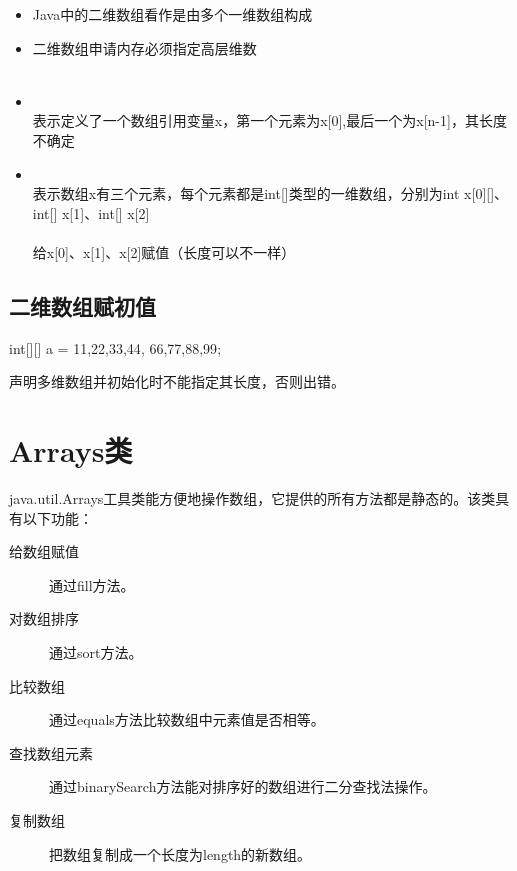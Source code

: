\begin{itemize}
\item Java中的二维数组看作是由多个一维数组构成
\item 二维数组申请内存必须指定{\Red 高层维数}\\
  \\
\item {}\\
  {\kai\Blue 表示定义了一个数组引用变量x，第一个元素为x[0],最后一个为x[n-1]，其长度不确定}
\item {}\\
  {\kai\Blue 表示数组x有三个元素，每个元素都是int[]类型的一维数组，分别为int x[0][]、int[] x[1]、int[] x[2]}\\
  \\
  {\kai\Blue 给x[0]、x[1]、x[2]赋值（长度可以不一样）}
\end{itemize}

\subsection{二维数组赋初值}

\begin{javaCode}
  int[][] a = {{11,22,33,44}, {66,77,88,99}};
\end{javaCode}


声明多维数组并初始化时不能指定其长度，否则出错。



\section{Arrays类}

java.util.Arrays工具类能方便地操作数组，它提供的所有方法都是静态的。该类具有以下功能：

\begin{description}
\item[给数组赋值] 通过fill方法。
\item[对数组排序] 通过sort方法。
\item[比较数组] 通过equals方法比较数组中元素值是否相等。
\item[查找数组元素] 通过binarySearch方法能对排序好的数组进行二分查找法操作。
\item[复制数组] 把数组复制成一个长度为length的新数组。
\end{description}

